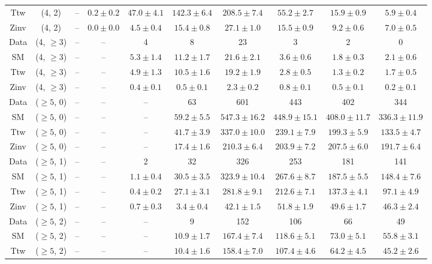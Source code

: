\begin{table}[h!]
{\begin{tabular}{cccccccccc}
	Ttw & (4, 2) & -- & $0.2\pm 0.2$ & $47.0\pm 4.1$ & $142.3\pm 6.4$ & $208.5\pm 7.4$ & $55.2\pm 2.7$ & $15.9\pm 0.9$ & $5.9\pm 0.4$ \\[0.5ex] 
	Zinv & (4, 2) & -- & $0.0\pm 0.0$ & $4.5\pm 0.4$ & $15.4\pm 0.8$ & $27.1\pm 1.0$ & $15.5\pm 0.9$ & $9.2\pm 0.6$ & $7.0\pm 0.5$ \\[0.5ex] 
	Data & (4, $\ge3$) & -- & -- & 4 & 8 & 23 & 3 & 2 & 0 \\[0.5ex] 
	SM & (4, $\ge3$) & -- & -- & $5.3\pm 1.4$ & $11.2\pm 1.7$ & $21.6\pm 2.1$ & $3.6\pm 0.6$ & $1.8\pm 0.3$ & $2.1\pm 0.6$ \\[0.5ex] 
	Ttw & (4, $\ge3$) & -- & -- & $4.9\pm 1.3$ & $10.5\pm 1.6$ & $19.2\pm 1.9$ & $2.8\pm 0.5$ & $1.3\pm 0.2$ & $1.7\pm 0.5$ \\[0.5ex] 
	Zinv & (4, $\ge3$) & -- & -- & $0.4\pm 0.1$ & $0.5\pm 0.1$ & $2.3\pm 0.2$ & $0.8\pm 0.1$ & $0.5\pm 0.1$ & $0.2\pm 0.1$ \\[0.5ex] 
	Data & ($\ge5$, 0) & -- & -- & -- & 63 & 601 & 443 & 402 & 344 \\[0.5ex] 
	SM & ($\ge5$, 0) & -- & -- & -- & $59.2\pm 5.5$ & $547.3\pm 16.2$ & $448.9\pm 15.1$ & $408.0\pm 11.7$ & $336.3\pm 11.9$ \\[0.5ex] 
	Ttw & ($\ge5$, 0) & -- & -- & -- & $41.7\pm 3.9$ & $337.0\pm 10.0$ & $239.1\pm 7.9$ & $199.3\pm 5.9$ & $133.5\pm 4.7$ \\[0.5ex] 
	Zinv & ($\ge5$, 0) & -- & -- & -- & $17.4\pm 1.6$ & $210.3\pm 6.4$ & $203.9\pm 7.2$ & $207.5\pm 6.0$ & $191.7\pm 6.4$ \\[0.5ex] 
	Data & ($\ge5$, 1) & -- & -- & 2 & 32 & 326 & 253 & 181 & 141 \\[0.5ex] 
	SM & ($\ge5$, 1) & -- & -- & $1.1\pm 0.4$ & $30.5\pm 3.5$ & $323.9\pm 10.4$ & $267.6\pm 8.7$ & $187.5\pm 5.5$ & $148.4\pm 7.6$ \\[0.5ex] 
	Ttw & ($\ge5$, 1) & -- & -- & $0.4\pm 0.2$ & $27.1\pm 3.1$ & $281.8\pm 9.1$ & $212.6\pm 7.1$ & $137.3\pm 4.1$ & $97.1\pm 4.9$ \\[0.5ex] 
	Zinv & ($\ge5$, 1) & -- & -- & $0.7\pm 0.3$ & $3.4\pm 0.4$ & $42.1\pm 1.5$ & $51.8\pm 1.9$ & $49.6\pm 1.7$ & $46.3\pm 2.4$ \\[0.5ex] 
	Data & ($\ge5$, 2) & -- & -- & -- & 9 & 152 & 106 & 66 & 49 \\[0.5ex] 
	SM & ($\ge5$, 2) & -- & -- & -- & $10.9\pm 1.7$ & $167.4\pm 7.4$ & $118.6\pm 5.1$ & $73.0\pm 5.1$ & $55.8\pm 3.1$ \\[0.5ex] 
	Ttw & ($\ge5$, 2) & -- & -- & -- & $10.4\pm 1.6$ & $158.4\pm 7.0$ & $107.4\pm 4.6$ & $64.2\pm 4.5$ & $45.2\pm 2.6$ \\[0.5ex] 

\end{tabular}}
\end{table}
